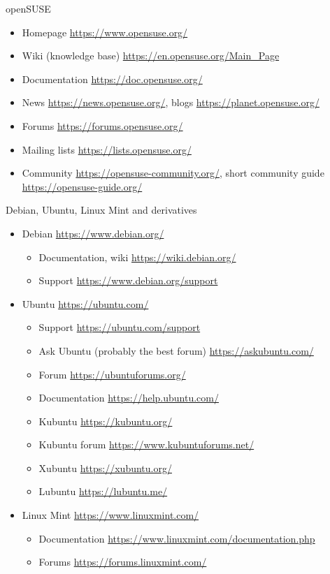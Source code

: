 \documentclass[compress, xelatex, 11pt, xcolor=svgnames, aspectratio=169,
	hyperref={
		bookmarks=true,
		unicode=true,
		colorlinks=true,
		pdftitle={Linux, command line and MetaCentrum},
		plainpages=false,
		pdfauthor={Vojtech Zeisek},
		pdfsubject={Course about use of Linux command line, writing shell scripts and using MetaCentrum of CESNET},
		pdfcreator={XeLaTeX},
		pdfkeywords={Linux, GNU, BASH, shell, command line, MetaCentrum},
		linkcolor=DarkRed, %
		anchorcolor=DarkBlue, %
		citecolor=Indigo, %
		filecolor=NavyBlue, %
		menucolor=DarkMagenta, %
		urlcolor=DarkBlue, %
		},
	url={hyphens, lowtilde} %
	]{beamer}
\begin{document}
\begin{frame}{openSUSE}
	\begin{itemize}
		\item Homepage \url{https://www.opensuse.org/}
		\item Wiki (knowledge base) \url{https://en.opensuse.org/Main_Page}
		\item Documentation \url{https://doc.opensuse.org/}
		\item News \url{https://news.opensuse.org/}, blogs \url{https://planet.opensuse.org/}
		\item Forums \url{https://forums.opensuse.org/}
		\item Mailing lists \url{https://lists.opensuse.org/}
		\item Community \url{https://opensuse-community.org/}, short community guide \url{https://opensuse-guide.org/}
	\end{itemize}
\end{frame}

\begin{frame}{Debian, Ubuntu, Linux Mint and derivatives}
	\begin{itemize}
		\item Debian \url{https://www.debian.org/}
		\begin{itemize}
			\item Documentation, wiki \url{https://wiki.debian.org/}
			\item Support \url{https://www.debian.org/support}
		\end{itemize}
		\item Ubuntu \url{https://ubuntu.com/}
		\begin{itemize}
			\item Support \url{https://ubuntu.com/support}
			\item Ask Ubuntu (probably the best forum) \url{https://askubuntu.com/}
			\item Forum \url{https://ubuntuforums.org/}
			\item Documentation \url{https://help.ubuntu.com/}
			\item Kubuntu \url{https://kubuntu.org/}
			\item Kubuntu forum \url{https://www.kubuntuforums.net/}
			\item Xubuntu \url{https://xubuntu.org/}
			\item Lubuntu \url{https://lubuntu.me/}
		\end{itemize}
		\item Linux Mint \url{https://www.linuxmint.com/}
		\begin{itemize}
			\item Documentation \url{https://www.linuxmint.com/documentation.php}
			\item Forums \url{https://forums.linuxmint.com/}
		\end{itemize}
	\end{itemize}
\end{frame}
\end{document}
